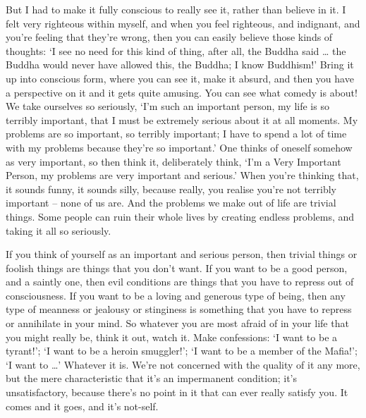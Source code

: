 But I had to make it fully conscious to really see it, rather than believe in it. I felt very righteous within myself, and when you feel righteous, and indignant, and you're feeling that they're wrong, then you can easily believe those kinds of thoughts: `I see no need for this kind of thing, after all, the Buddha said \ldots{} the Buddha would never have allowed this, the Buddha; I know Buddhism!' Bring it up into conscious form, where you can see it, make it absurd, and then you have a perspective on it and it gets quite amusing. You can see what comedy is about! We take ourselves so seriously, `I'm such an important person, my life is so terribly important, that I must be extremely serious about it at all moments. My problems are so important, so terribly important; I have to spend a lot of time with my problems because they're so important.' One thinks of oneself somehow as very important, so then think it, deliberately think, `I'm a Very Important Person, my problems are very important and serious.' When you're thinking that, it sounds funny, it sounds silly, because really, you realise you're not terribly important -- none of us are. And the problems we make out of life are trivial things. Some people can ruin their whole lives by creating endless problems, and taking it all so seriously.

If you think of yourself as an important and serious person, then trivial things or foolish things are things that you don't want. If you want to be a good person, and a saintly one, then evil conditions are things that you have to repress out of consciousness. If you want to be a loving and generous type of being, then any type of meanness or jealousy or stinginess is something that you have to repress or annihilate in your mind. So whatever you are most afraid of in your life that you might really be, think it out, watch it. Make confessions: `I want to be a tyrant!'; `I want to be a heroin smuggler!'; `I want to be a member of the Mafia!'; `I want to \ldots{}' Whatever it is. We're not concerned with the quality of it any more, but the mere characteristic that it's an impermanent condition; it's unsatisfactory, because there's no point in it that can ever really satisfy you. It comes and it goes, and it's not-self.


